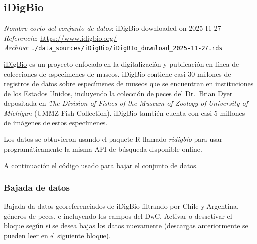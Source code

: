 \documentclass[sn-apa,pdflatex]{sn-jnl}
\begin{document}
\subsection{iDigBio}\label{idigbio}

\emph{Nombre corto del conjunto de datos}: iDigBio downloaded on
2025-11-27 \emph{Referencia}: \url{https://www.idigbio.org/}\\
\emph{Archivo}:
\texttt{./data\_sources/iDigBio/iDigBIo\_download\_2025-11-27.rds}

\href{https://www.idigbio.org/}{iDigBio} es un proyecto enfocado en la
digitalización y publicación en línea de colecciones de especímenes de
museos. iDigBio contiene casi 30 millones de registros de datos sobre
especímenes de museos que se encuentran en instituciones de los Estados
Unidos, incluyendo la colección de peces del Dr.~Brian Dyer depositada
en \emph{The Division of Fishes of the Museum of Zoology of University
of Michigan} (UMMZ Fish Collection). iDigBio también cuenta con casi 5
millones de imágenes de estos especímenes.

Los datos se obtuvieron usando el paquete R llamado \emph{ridigbio}
\citep{Michonneau2016} para usar programáticamente la misma API de
búsqueda disponible online.

A continuación el código usado para bajar el conjunto de datos.

\subsubsection{Bajada de datos}\label{bajada-de-datos}

Bajada da datos georeferenciados de iDigBio filtrando por Chile y
Argentina, géneros de peces, e incluyendo los campos del DwC. Activar o
desactivar el bloque según si se desea bajas los datos nuevamente
(descargas anteriormente se pueden leer en el siguiente bloque).
\end{document}
